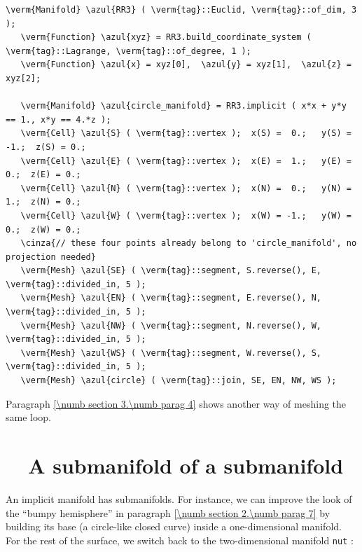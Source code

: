 \begin{Verbatim}[commandchars=\\\{\},formatcom=\small\tt,frame=single,
   label=parag-\ref{\numb section 2.\numb parag 12}.cpp,rulecolor=\color{coment},
   baselinestretch=0.94,framesep=2mm]
   \verm{Manifold} \azul{RR3} ( \verm{tag}::Euclid, \verm{tag}::of_dim, 3 );
   \verm{Function} \azul{xyz} = RR3.build_coordinate_system ( \verm{tag}::Lagrange, \verm{tag}::of_degree, 1 );
   \verm{Function} \azul{x} = xyz[0],  \azul{y} = xyz[1],  \azul{z} = xyz[2];

   \verm{Manifold} \azul{circle_manifold} = RR3.implicit ( x*x + y*y == 1., x*y == 4.*z );
   \verm{Cell} \azul{S} ( \verm{tag}::vertex );  x(S) =  0.;   y(S) = -1.;  z(S) = 0.;
   \verm{Cell} \azul{E} ( \verm{tag}::vertex );  x(E) =  1.;   y(E) =  0.;  z(E) = 0.;
   \verm{Cell} \azul{N} ( \verm{tag}::vertex );  x(N) =  0.;   y(N) =  1.;  z(N) = 0.;
   \verm{Cell} \azul{W} ( \verm{tag}::vertex );  x(W) = -1.;   y(W) =  0.;  z(W) = 0.;
   \cinza{// these four points already belong to 'circle_manifold', no projection needed}
   \verm{Mesh} \azul{SE} ( \verm{tag}::segment, S.reverse(), E, \verm{tag}::divided_in, 5 );
   \verm{Mesh} \azul{EN} ( \verm{tag}::segment, E.reverse(), N, \verm{tag}::divided_in, 5 );
   \verm{Mesh} \azul{NW} ( \verm{tag}::segment, N.reverse(), W, \verm{tag}::divided_in, 5 );
   \verm{Mesh} \azul{WS} ( \verm{tag}::segment, W.reverse(), S, \verm{tag}::divided_in, 5 );
   \verm{Mesh} \azul{circle} ( \verm{tag}::join, SE, EN, NW, WS );
\end{Verbatim}

Paragraph \ref{\numb section 3.\numb parag 4} shows another way of meshing the same loop.


\section{~~A submanifold of a submanifold}\label{\numb section 2.\numb parag 13}

An implicit manifold has submanifolds.
For instance, we can improve the look of the ``bumpy hemisphere'' in paragraph
\ref{\numb section 2.\numb parag 7} by building its base (a circle-like closed curve)
inside a one-dimensional manifold.
For the rest of the surface, we switch back to the two-dimensional manifold {\small\tt nut} :
\medskip

